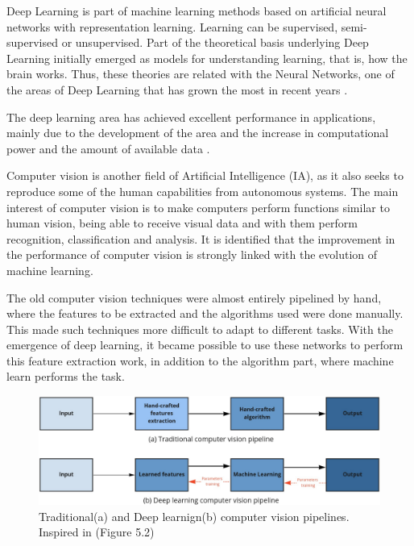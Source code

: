  Deep Learning is part of machine learning methods based on artificial neural networks with representation learning. Learning can be supervised, semi-supervised or unsupervised. Part of the theoretical basis underlying Deep Learning  initially emerged as models for understanding learning, that is, how the brain works. Thus, these theories are related with the Neural Networks, one of the areas of Deep Learning  that has grown the most in recent years \cite{goodfellow2016}.

The deep learning area has achieved excellent performance in applications, mainly due to the development of the area and the increase in computational power and the amount of available data \cite{geron2019}. 

Computer vision is another field of Artificial Intelligence (IA), as it also seeks to reproduce some of the human capabilities from autonomous systems. The main interest of computer vision is to make computers perform functions similar to human vision, being able to receive visual data and with them perform recognition, classification and analysis. It is identified that the improvement in the performance of computer vision is strongly linked with the evolution of machine learning.

The old computer vision techniques were almost entirely pipelined by hand, where the features to be extracted and the algorithms used were done manually. This made such techniques more difficult to adapt to different tasks. With the emergence of deep learning, it became possible to use these networks to perform this feature extraction work, in addition to the algorithm part, where machine learn performs the task.

\begin{figure}
    \centering
    \includegraphics[scale=0.20]{"Part 3 - Learning Systems/Supervised Learning/Deep Learning/images/cvpipeline.png"}
    \caption{Traditional(a) and Deep learnign(b) computer vision pipelines. Inspired in \cite{szeliski2010computer}(Figure 5.2)}
    \label{fig:figurecvpipeline}
\end{figure}

